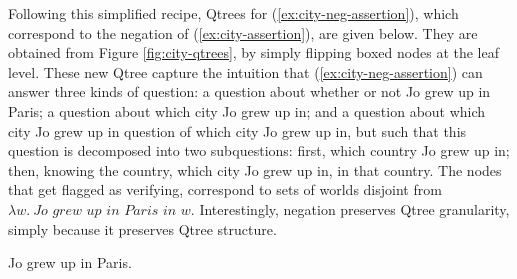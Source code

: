 \begin{exe}
	\label{ex2:qtree-neg-def-leaves}
\end{exe}

Following this simplified recipe, Qtrees for (\ref{ex:city-neg-assertion}), which correspond to the negation of (\ref{ex:city-assertion}), are given below. They are obtained from Figure \ref{fig:city-qtrees}, by simply flipping boxed nodes at the leaf level. These new Qtree capture the intuition that (\ref{ex:city-neg-assertion}) can answer three kinds of question: a question about whether or not Jo grew up in Paris; a question about which city Jo grew up in; and a question about which city Jo grew up in question of which city Jo grew up in, but such that this question is decomposed into two subquestions: first, which country Jo grew up in; then, knowing the country, which city Jo grew up in, in that country. The nodes that get flagged as verifying, correspond to sets of worlds disjoint from $\lambda w. \ \textit{Jo grew up in Paris in $w$}.$ Interestingly, negation preserves Qtree granularity, simply because it preserves Qtree structure.

\begin{exe}
	 {Jo grew up in Paris.}
	\label{ex:city-neg-assertion}
\end{exe}


